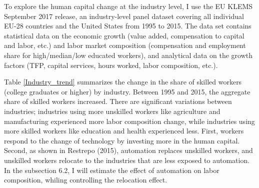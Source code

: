 \documentclass[12pt]{article}
\begin{document}
To explore the human capital change at the industry level, I use the EU KLEMS September 2017 release, an industry-level panel dataset covering all individual EU-28 countries and the United States from 1995 to 2015. The data set contains statistical data on the economic growth (value added, compensation to capital and labor, etc.) and labor market composition (compensation and employment share for high/median/low educated workers), and analytical data on the growth factors (TFP, capital services, hours worked, labor composition, etc.). 

Table \ref{Industry_trend} summarizes the change in the share of skilled workers (college graduates or higher) by industry. Between 1995 and 2015, the aggregate share of skilled workers increased. There are significant variations between industries; industries using more unskilled workers like agriculture and manufacturing experienced more labor composition change, while industries using more skilled workers like education and health experienced less. First, workers respond to the change of technology by investing more in the human capital. Second, as shown in Restrepo (2015)\nocite{Restrepo2015}, automation replaces unskilled workers, and unskilled workers relocate to the industries that are less exposed to automation. In the subsection 6.2, I will estimate the effect of automation on labor composition, whiling controlling the relocation effect. 
\end{document}
